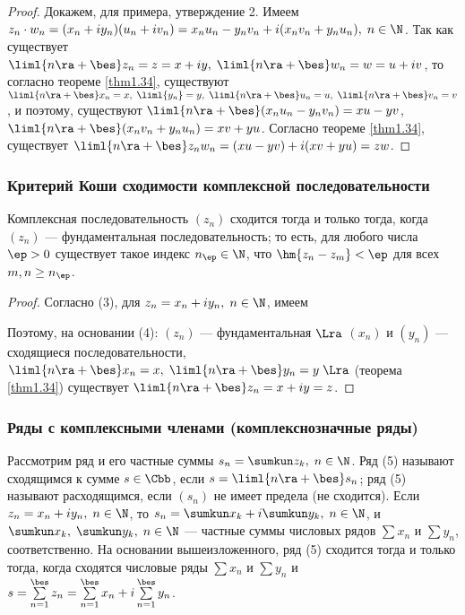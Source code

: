 \documentclass[a4paper]{article}
\begin{document}
\begin{proof}
Докажем, для примера, утверждение 2. Имеем $z_n\cdot w_n = (x_n +
iy_n)(u_n+iv_n) = x_nu_n-y_nv_n + i(x_nv_n+y_nu_n), \; n\in\N$. Так
как существует $\liml{n\ra+\bes}z_n = z = x+iy, \;
\liml{n\ra+\bes}w_n = w = u+iv$, то согласно теореме \ref{thm1.34},
существуют $\liml{n\ra+\bes}x_n=x, \; \liml{y_n}=y, \;
\liml{n\ra+\bes} u_n=u, \; \liml{n\ra+\bes}v_n=v$, и поэтому,
существуют $\liml{n\ra+\bes} (x_nu_n-y_nv_n)=xu-yv$,
$\liml{n\ra+\bes} (x_nv_n+y_nu_n)=xv+yu$. Согласно теореме
\ref{thm1.34}, существует $\liml{n\ra+\bes}
z_nw_n=(xu-yv)+i(xv+yu)=zw$.
\end{proof}

\subsubsection{Критерий Коши сходимости комплексной
последовательности}
\begin{theorem}
Комплексная последовательность $(z_n)$ сходится тогда и только
тогда, когда $(z_n)$ --- фундаментальная последовательность; то
есть, для любого числа $\ep>0$ существует такое индекс
$n_{\ep}\in\N$, что $\hm{z_n-z_m}<\ep$ для всех $m,n\ge n_{\ep}$.
\end{theorem}

\begin{proof}
Согласно (3), для $z_n = x_n+iy_n, \; n\in\N$, имеем

Поэтому, на основании (4): $(z_n)$ --- фундаментальная $\Lra$
$(x_n)$ и $(y_n)$ --- сходящиеся последовательности,
$\liml{n\ra+\bes} x_n = x, \; \liml{n\ra+\bes}y_n=y \; \Lra$
(теорема \ref{thm1.34}) существует $\liml{n\ra+\bes}z_n=x+iy=z$.
\end{proof}

\subsubsection{Ряды с комплексными членами (комплекснозначные ряды)}

Рассмотрим ряд  и его частные суммы $s_n=\sumkun z_k, \;
n\in\N$. Ряд (5) называют сходящимся к сумме $s\in\Cbb$, если
$s=\liml{n\ra+\bes} s_n$; ряд (5) называют расходящимся, если
$(s_n)$ не имеет предела (не сходится). Если $z_n=x_n+iy_n, \;
n\in\N$, то $s_n = \sumkun x_k + i\sumkun y_k, \; n\in\N$, и
$\sumkun x_k, \; \sumkun y_k, \; n\in\N$ --- частные суммы числовых
рядов $\sum x_n$ и $\sum y_n$, соответственно. На основании
вышеизложенного, ряд (5) сходится тогда и только тогда, когда
сходятся числовые ряды $\sum x_n$ и $\sum y_n$ и
$s=\sum\limits_{n=1}^{\bes} z_n = \sum\limits_{n=1}^{\bes} x_n +
i\sum\limits_{n=1}^{\bes} y_n$.
\end{document}
